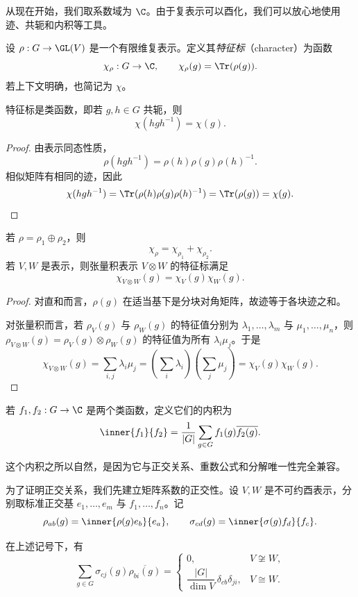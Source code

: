 从现在开始，我们取系数域为 $\C$。由于复表示可以酉化，我们可以放心地使用迹、共轭和内积等工具。

\begin{definition}
设 $\rho:G\to \GL(V)$ 是一个有限维复表示。定义其\emph{特征标}（character）为函数
\[
\chi_\rho:G\to \C,\qquad \chi_\rho(g)=\Tr(\rho(g)).
\]
若上下文明确，也简记为 $\chi$。
\end{definition}

\begin{proposition}
特征标是类函数，即若 $g,h\in G$ 共轭，则
\[
\chi(hgh^{-1})=\chi(g).
\]
\end{proposition}

\begin{proof}
由表示同态性质，
\[
\rho(hgh^{-1})=\rho(h)\rho(g)\rho(h)^{-1}.
\]
相似矩阵有相同的迹，因此
\[
\chi(hgh^{-1})=\Tr(\rho(h)\rho(g)\rho(h)^{-1})=\Tr(\rho(g))=\chi(g).
\]
\end{proof}

\begin{proposition}
若 $\rho=\rho_1\oplus \rho_2$，则
\[
\chi_\rho=\chi_{\rho_1}+\chi_{\rho_2}.
\]
若 $V,W$ 是表示，则张量积表示 $V\otimes W$ 的特征标满足
\[
\chi_{V\otimes W}(g)=\chi_V(g)\chi_W(g).
\]
\end{proposition}

\begin{proof}
对直和而言，$\rho(g)$ 在适当基下是分块对角矩阵，故迹等于各块迹之和。

对张量积而言，若 $\rho_V(g)$ 与 $\rho_W(g)$ 的特征值分别为 $\lambda_1,\dots,\lambda_m$ 与 $\mu_1,\dots,\mu_n$，则 $\rho_{V\otimes W}(g)=\rho_V(g)\otimes \rho_W(g)$ 的特征值为所有 $\lambda_i\mu_j$。于是
\[
\chi_{V\otimes W}(g)=\sum_{i,j}\lambda_i\mu_j
=\left(\sum_i\lambda_i\right)\left(\sum_j\mu_j\right)
=\chi_V(g)\chi_W(g).
\]
\end{proof}

\begin{definition}
若 $f_1,f_2:G\to \C$ 是两个类函数，定义它们的内积为
\[
\inner{f_1}{f_2}=\frac{1}{|G|}\sum_{g\in G}f_1(g)\overline{f_2(g)}.
\]
\end{definition}

这个内积之所以自然，是因为它与正交关系、重数公式和分解唯一性完全兼容。

为了证明正交关系，我们先建立矩阵系数的正交性。设 $V,W$ 是不可约酉表示，分别取标准正交基 $e_1,\dots,e_m$ 与 $f_1,\dots,f_n$。记
\[
\rho_{ab}(g)=\inner{\rho(g)e_b}{e_a},\qquad
\sigma_{cd}(g)=\inner{\sigma(g)f_d}{f_c}.
\]

\begin{lemma}[矩阵系数正交关系]
在上述记号下，有
\[
\sum_{g\in G}\sigma_{cj}(g)\overline{\rho_{bi}(g)}=
\begin{cases}
0, & V\not\cong W,\\[4pt]
\dfrac{|G|}{\dim V}\,\delta_{cb}\delta_{ji}, & V\cong W.
\end{cases}
\]
\end{lemma}

